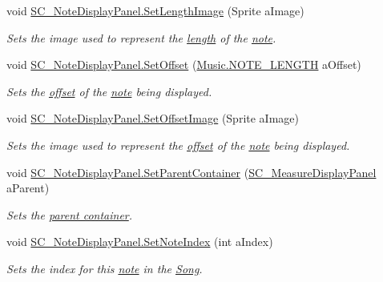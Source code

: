 \begin{DoxyCompactItemize}
void \hyperlink{group___s_c___n_d_p_unity_ga1a1c4b8111463ec3e134d17fe5064a54}{S\+C\+\_\+\+Note\+Display\+Panel.\+Set\+Length\+Image} (Sprite a\+Image)
\begin{DoxyCompactList}\small\item\em Sets the image used to represent the \hyperlink{group___music_enums_gaf11b5f079adbb21c800b9eca1c5c3cbd}{length} of the \hyperlink{group___music_structs_struct_music_1_1_combined_note}{note}. \end{DoxyCompactList}\item 
void \hyperlink{group___s_c___n_d_p_unity_ga8ff7588e8c3f59a03842feaff92f97e9}{S\+C\+\_\+\+Note\+Display\+Panel.\+Set\+Offset} (\hyperlink{group___music_enums_gaf11b5f079adbb21c800b9eca1c5c3cbd}{Music.\+N\+O\+T\+E\+\_\+\+L\+E\+N\+G\+TH} a\+Offset)
\begin{DoxyCompactList}\small\item\em Sets the \hyperlink{group___music_structs_ae281187907aed4c728c7981300dbebaf}{offset} of the \hyperlink{group___music_structs_struct_music_1_1_combined_note}{note} being displayed. \end{DoxyCompactList}\item 
void \hyperlink{group___s_c___n_d_p_unity_gaa0a517d1359cd1ed109a130bd52763f1}{S\+C\+\_\+\+Note\+Display\+Panel.\+Set\+Offset\+Image} (Sprite a\+Image)
\begin{DoxyCompactList}\small\item\em Sets the image used to represent the \hyperlink{group___music_structs_ae281187907aed4c728c7981300dbebaf}{offset} of the \hyperlink{group___music_structs_struct_music_1_1_combined_note}{note} being displayed. \end{DoxyCompactList}\item 
void \hyperlink{group___s_c___n_d_p_unity_gae642b50484b9c7fb2bd3b201aeef726c}{S\+C\+\_\+\+Note\+Display\+Panel.\+Set\+Parent\+Container} (\hyperlink{class_s_c___measure_display_panel}{S\+C\+\_\+\+Measure\+Display\+Panel} a\+Parent)
\begin{DoxyCompactList}\small\item\em Sets the \hyperlink{group___doc_s_c___m_d_p}{parent container}. \end{DoxyCompactList}\item 
void \hyperlink{group___s_c___n_d_p_unity_gaf3160e3686e44e7718768242438ea1cc}{S\+C\+\_\+\+Note\+Display\+Panel.\+Set\+Note\+Index} (int a\+Index)
\begin{DoxyCompactList}\small\item\em Sets the index for this \hyperlink{group___music_structs_struct_music_1_1_combined_note}{note} in the \hyperlink{class_song}{Song}. \end{DoxyCompactList}\item 

\end{DoxyCompactItemize}
